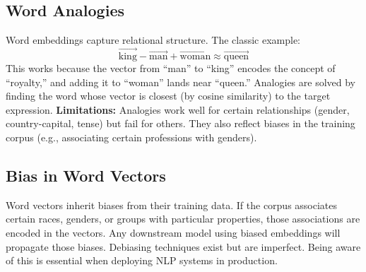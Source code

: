 \documentclass[11pt]{article}
\begin{document}
\subsection{Word Analogies}
Word embeddings capture relational structure. The classic example:
\[
\vec{\text{king}} - \vec{\text{man}} + \vec{\text{woman}} \approx \vec{\text{queen}}
\]
This works because the vector from ``man'' to ``king'' encodes the concept of ``royalty,'' and adding it to ``woman'' lands near ``queen.'' Analogies are solved by finding the word whose vector is closest (by cosine similarity) to the target expression.
\textbf{Limitations:} Analogies work well for certain relationships (gender, country-capital, tense) but fail for others. They also reflect biases in the training corpus (e.g., associating certain professions with genders).
\subsection{Bias in Word Vectors}
Word vectors inherit biases from their training data. If the corpus associates certain races, genders, or groups with particular properties, those associations are encoded in the vectors.
Any downstream model using biased embeddings will propagate those biases. Debiasing techniques exist but are imperfect. Being aware of this is essential when deploying NLP systems in production.
\end{document}
